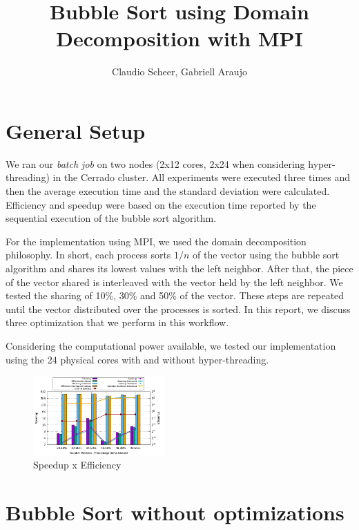 \documentclass[10pt,twocolumn]{article}
\begin{document}
\title{\vspace{-1.5cm}Bubble Sort using Domain Decomposition with MPI}
\author[]{Claudio Scheer, Gabriell Araujo}
\date{}

\maketitle


\section*{General Setup}

We ran our \textit{batch job} on two nodes (2x12 cores, 2x24 when considering hyper-threading) in the Cerrado cluster. All experiments were executed three times and then the average execution time and the standard deviation were calculated. Efficiency and speedup were based on the execution time reported by the sequential execution of the bubble sort algorithm.

For the implementation using MPI, we used the domain decomposition philosophy. In short, each process sorts $1/n$ of the vector using the bubble sort algorithm and shares its lowest values with the left neighbor. After that, the piece of the vector shared is interleaved with the vector held by the left neighbor. We tested the sharing of 10\%, 30\% and 50\% of the vector. These steps are repeated until the vector distributed over the processes is sorted. In this report, we discuss three optimization that we perform in this workflow.

Considering the computational power available, we tested our implementation using the 24 physical cores with and without hyper-threading.

\begin{figure}[ht]
	\centering
	\includegraphics[width=0.45\textwidth]{../logs/scripts/bubble-sort-speedup-efficiency.pdf}
	\caption{Speedup x Efficiency}
	\label{fig:bubble-sort-speedup-efficiency}
\end{figure}


\section*{Bubble Sort without optimizations}
\end{document}
